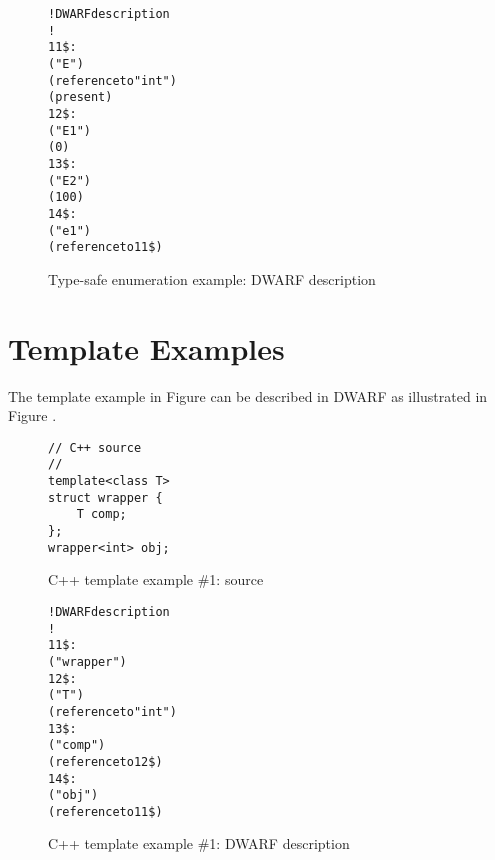 \begin{figure}[H]
\begin{dwflisting}
\begin{alltt}
! DWARF description
!
11\$:  \DWTAGenumerationtype
          \DWATname("E")
          \DWATtype(reference to "int")
          \DWATenumclass(present)
12\$:      \DWTAGenumerator
              \DWATname("E1")
              \DWATconstvalue(0)
13\$:      \DWTAGenumerator
              \DWATname("E2")
              \DWATconstvalue(100)
14\$:  \DWTAGvariable
         \DWATname("e1")
         \DWATtype(reference to 11\$)
\end{alltt}
\end{dwflisting}
\caption{Type-safe enumeration example: DWARF description}
\label{fig:ctypesafeenumerationexampledwarf}
\end{figure}


\clearpage
\section{Template Examples}
\label{app:templateexample}

The  template example in
Figure 
can be described in DWARF as illustrated in 
Figure .

\begin{figure}[h]
\begin{lstlisting}
// C++ source
//
template<class T>
struct wrapper {
    T comp;
};
wrapper<int> obj;
\end{lstlisting}
\caption{C++ template example \#1: source}
\label{fig:ctemplateexample1source}
\end{figure}

\begin{figure}[h]
\begin{dwflisting}
\begin{alltt}
! DWARF description
!
11\$: \DWTAGstructuretype
        \DWATname("wrapper")
12\$:    \DWTAGtemplatetypeparameter
            \DWATname("T")
            \DWATtype(reference to "int")
13\$:    \DWTAGmember
            \DWATname("comp")
            \DWATtype(reference to 12\$)
14\$: \DWTAGvariable
        \DWATname("obj")
        \DWATtype(reference to 11\$)
\end{alltt}
\end{dwflisting}
\caption{C++ template example \#1: DWARF description}
\label{fig:ctemplateexample1dwarf}
\end{figure}

